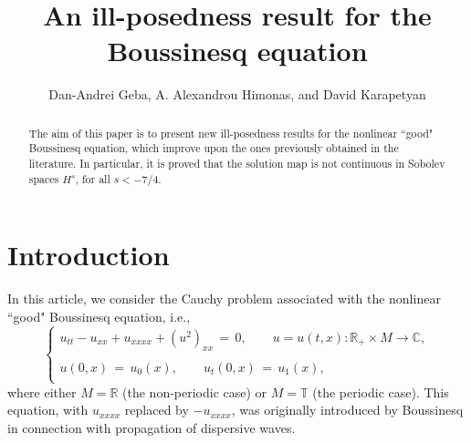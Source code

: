 \documentclass{amsart}
\begin{document}
\title{An ill-posedness result for the Boussinesq equation}

\author{Dan-Andrei Geba, A. Alexandrou Himonas, and David Karapetyan}

\address{Department of Mathematics, University of Rochester, Rochester, NY 14627}
\address{Department of Mathematics, University of Notre Dame, Notre Dame, IN 46556}
\address{Department of Mathematics, University of Notre Dame, Notre Dame, IN 46556}
\date{}

\begin{abstract}
The aim of this paper is to present new ill-posedness results for the nonlinear ``good" Boussinesq equation, which improve upon the ones previously obtained in the literature. In particular, it is proved that the solution map is not continuous in Sobolev spaces $H^s$, for all $s<-7/4$.

\end{abstract}


\maketitle

\section{Introduction}

In this article, we consider the Cauchy problem associated with the  nonlinear ``good" Boussinesq equation, i.e.,
\begin{equation}
\left\{
\begin{array}{l}
u_{tt}-u_{xx}+u_{xxxx}+(u^2)_{xx}\,=\,0, \qquad u=u(t,x): \mathbb{R}_+\times M \to \mathbb{C},\\
\\
u(0,x)\,=\,u_0(x),\qquad u_t(0,x)\,=\,u_1(x),\\
\end{array}\right.
\label{main}
\end{equation}
where either $M=\mathbb{R}$ (the non-periodic case) or $M=\mathbb{T}$ (the periodic case). This equation, with $u_{xxxx}$ replaced by $-u_{xxxx}$, was originally introduced by Boussinesq \cite{B72} in connection with propagation of dispersive waves. 
\end{document}
